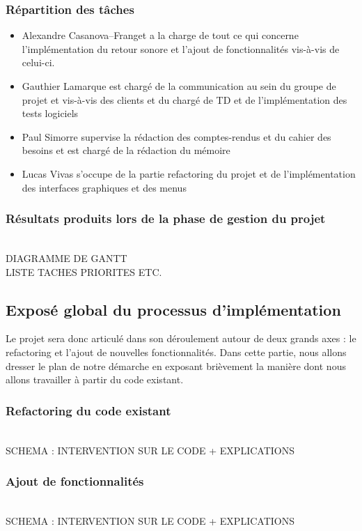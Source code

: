 \subsubsection{Répartition des tâches}
\begin{itemize}
\item Alexandre Casanova--Franget a la charge de tout ce qui concerne l'implémentation du retour sonore et l'ajout de fonctionnalités vis-à-vis de celui-ci.
\item Gauthier Lamarque est chargé de la communication au sein du groupe de projet et vis-à-vis des clients et du chargé de TD et de l'implémentation des tests logiciels
\item Paul Simorre supervise la rédaction des comptes-rendus et du cahier des besoins et est chargé de la rédaction du mémoire
\item Lucas Vivas s'occupe de la partie refactoring du projet et de l'implémentation des interfaces graphiques et des menus
\end{itemize}

\subsubsection{Résultats produits lors de la phase de gestion du projet}
\\
DIAGRAMME DE GANTT
\\
LISTE TACHES PRIORITES ETC.
\\

\subsection{Exposé global du processus d'implémentation}
Le projet sera donc articulé dans son déroulement autour de deux
grands axes : le refactoring et l'ajout de nouvelles
fonctionnalités. Dans cette partie, nous allons dresser le plan de
notre démarche en exposant brièvement la manière dont nous allons
travailler à partir du code existant.

\subsubsection{Refactoring du code existant}
\\
SCHEMA : INTERVENTION SUR LE CODE + EXPLICATIONS
\\

\subsubsection{Ajout de fonctionnalités}
\\
SCHEMA : INTERVENTION SUR LE CODE + EXPLICATIONS
\\
